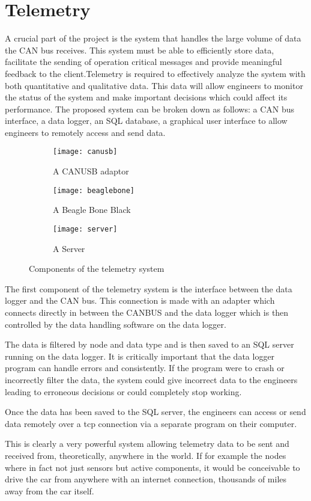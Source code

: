 \documentclass[10pt,a4paper]{article}
\begin{document}
\section{Telemetry}
A crucial part of the project is the system that handles the large volume of data the CAN bus receives. This system must be able to efficiently store data, facilitate the sending of operation critical messages and provide meaningful feedback to the client.Telemetry is required to effectively analyze the system with both quantitative and qualitative data. This data will allow engineers to monitor the status of the system and make important decisions which could affect its performance. The proposed system can be broken down as follows: a CAN bus interface, a data logger, an SQL database, a graphical user interface to allow engineers to remotely access and send data.
\begin{wrapfigure}{r}{0.5\textwidth}
         \centering
         \begin{subfigure}[b]{0.6\textwidth}
                 \texttt{[image: canusb]}
                 \caption{A CANUSB adaptor}
                 \label{fig:CANUSB adaptor}
         \end{subfigure}

         \begin{subfigure}[b]{0.4\textwidth}
                 \texttt{[image: beaglebone]}
                 \caption{A Beagle Bone Black}
                 \label{fig:Beable Bone Black}
         \end{subfigure}

         \begin{subfigure}[b]{0.5\textwidth}
                 \texttt{[image: server]}
                 \caption{A Server}
                 \label{fig:Sever}
         \end{subfigure}
         \caption{Components of the telemetry system}\label{fig:telemetry}
\end{wrapfigure}
The first component of the telemetry system is the interface between the data logger and the CAN bus. This connection is made with an adapter which connects directly in between the CANBUS and the data logger which is then controlled by the data handling software on the data logger.

The data is filtered by node and data type and is then saved to an SQL server running on the data logger. It is critically important that the data logger program can handle errors and consistently. If the program were to crash or incorrectly filter the data, the system could give incorrect data to the engineers leading to erroneous decisions or could completely stop working.

Once the data has been saved to the SQL server, the engineers can access or send data remotely over a tcp connection via a separate program on their computer. 

This is clearly a very powerful system allowing telemetry data to be sent and received from, theoretically,  anywhere in the world. If for example the nodes where in fact not just sensors but active components, it would be conceivable to drive the car from anywhere with an internet connection, thousands of miles away from the car itself.
\end{document}
